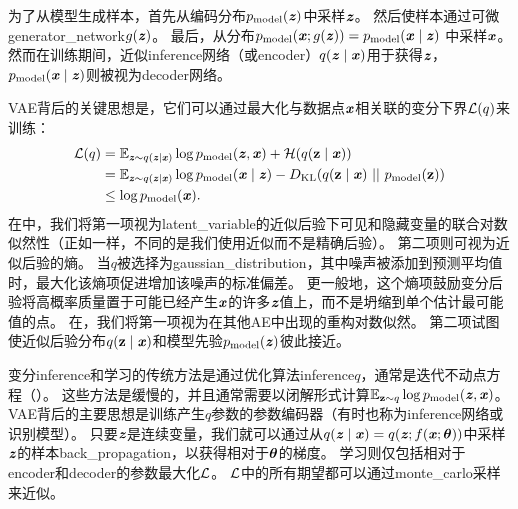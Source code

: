 为了从模型生成样本，首先从编码分布$p_{\text{model}}(\Vz)$中采样$\Vz$。
然后使样本通过可微\gls{generator_network}$g(\Vz)$。
最后，从分布$p_{\text{model}}(\Vx;g(\Vz)) = p_{\text{model}}(\Vx  \mid  \Vz)$ 中采样$\Vx$。
然而在训练期间，近似\gls{inference}网络（或\gls{encoder}）$q(\Vz  \mid  \Vx)$用于获得$\Vz$，$p_{\text{model}}(\Vx  \mid  \Vz)$则被视为\gls{decoder}网络。


\gls{VAE}背后的关键思想是，它们可以通过最大化与数据点$\Vx$相关联的变分下界$\CalL(q)$来训练：
\begin{align}
\CalL(q) &= \SetE_{\Vz \sim q(\Vz  \mid  \Vx)} \log p_{\text{model}} (\Vz, \Vx)
+ \CalH(q(\RVz  \mid  \Vx)) \label{eq:var_lower}  \\
&= \SetE_{\Vz \sim q(\Vz  \mid  \Vx)} \log p_{\text{model}} (\Vx  \mid  \Vz)
- D_{\text{KL}}(q(\RVz  \mid  \Vx) ~||~ p_{\text{model}}(\RVz)) \label{eq:var_kl} \\
& \leq \log p_{\text{model}}(\Vx).
\end{align}
在中，我们将第一项视为\gls{latent_variable}的近似后验下可见和隐藏变量的联合对数似然性（正如一样，不同的是我们使用近似而不是精确后验）。
第二项则可视为近似后验的熵。
当$q$被选择为\gls{gaussian_distribution}，其中噪声被添加到预测平均值时，最大化该熵项促进增加该噪声的标准偏差。
更一般地，这个熵项鼓励变分后验将高概率质量置于可能已经产生$\Vx$的许多$\Vz$值上，而不是坍缩到单个估计最可能值的点。
在，我们将第一项视为在其他\gls{AE}中出现的重构对数似然。
第二项试图使近似后验分布$q(\RVz  \mid  \Vx)$和模型先验$p_{\text{model}}(\Vz)$彼此接近。


变分\gls{inference}和学习的传统方法是通过优化算法\gls{inference}$q$，通常是迭代不动点方程（）。
这些方法是缓慢的，并且通常需要以闭解形式计算$\SetE_{\RVz \sim q} \log p_{\text{model}} (\Vz, \Vx)$。
\gls{VAE}背后的主要思想是训练产生$q$参数的参数编码器（有时也称为\gls{inference}网络或识别模型）。
只要$\Vz$是连续变量，我们就可以通过从$q(\Vz  \mid  \Vx) = q(\Vz; f(\Vx; \Vtheta))$中采样$\Vz$的样本\gls{back_propagation}，以获得相对于$\Vtheta$的梯度。
学习则仅包括相对于\gls{encoder}和\gls{decoder}的参数最大化$\CalL$。
$\CalL$中的所有期望都可以通过\gls{monte_carlo}采样来近似。


